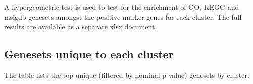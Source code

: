 A hypergeometric test is used to test for the enrichment of GO, KEGG and msigdb genesets amongst the positive marker genes for each cluster. The full results
are available as a separate xlsx document.



\clearpage

\subsection{Genesets unique to each cluster}

The table lists the top unique (filtered by nominal p value) genesets by cluster.



\clearpage
